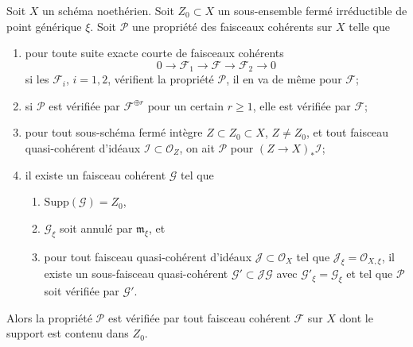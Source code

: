 \begin{lemma}
\label{lemma-property-irreducible-higher-rank-cohomological}
Soit $X$ un schéma noethérien. Soit $Z_0 \subset X$ un sous-ensemble fermé
irréductible de point générique $\xi$. Soit $\mathcal{P}$ une propriété des
faisceaux cohérents sur $X$ telle que
\begin{enumerate}
\item pour toute suite exacte courte de faisceaux cohérents
$$
0 \to \mathcal{F}_1 \to \mathcal{F} \to \mathcal{F}_2 \to 0
$$
si les $\mathcal{F}_i$, $i = 1, 2$, vérifient la propriété $\mathcal{P}$,
il en va de même pour $\mathcal{F}$;
\item si $\mathcal{P}$ est vérifiée par $\mathcal{F}^{\oplus r}$ pour un
certain $r \geq 1$, elle est vérifiée par $\mathcal{F}$;
\item pour tout sous-schéma fermé intègre $Z \subset Z_0 \subset X$,
$Z \not = Z_0$, et tout faisceau quasi-cohérent d'idéaux
$\mathcal{I} \subset \mathcal{O}_Z$, on ait
$\mathcal{P}$ pour $(Z \to X)_*\mathcal{I}$;
\item il existe un faisceau cohérent $\mathcal{G}$ tel que
\begin{enumerate}
\item $\text{Supp}(\mathcal{G}) = Z_0$,
\item $\mathcal{G}_\xi$ soit annulé par $\mathfrak m_\xi$, et
\item pour tout faisceau quasi-cohérent d'idéaux
$\mathcal{J} \subset \mathcal{O}_X$ tel que
$\mathcal{J}_\xi = \mathcal{O}_{X, \xi}$, il existe un sous-faisceau
quasi-cohérent $\mathcal{G}' \subset \mathcal{J}\mathcal{G}$ avec
$\mathcal{G}'_\xi = \mathcal{G}_\xi$ et tel que
$\mathcal{P}$ soit vérifiée par $\mathcal{G}'$.
\end{enumerate}
\end{enumerate}
Alors la propriété $\mathcal{P}$ est vérifiée par tout faisceau cohérent
$\mathcal{F}$ sur $X$ dont le support est contenu dans $Z_0$.
\end{lemma}

